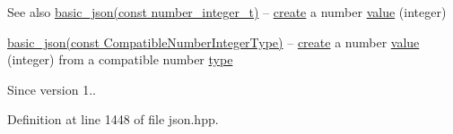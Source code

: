 \begin{DoxySeeAlso}{See also}
\hyperlink{classnlohmann_1_1basic__json_a0d838bc7ffca6017f51167e0a8ffd9b6}{basic\+\_\+json(const number\+\_\+integer\+\_\+t)} -- \hyperlink{classnlohmann_1_1basic__json_a27df4303fbc83071275074486b54a40e}{create} a number \hyperlink{classnlohmann_1_1basic__json_a0a2cbbd95862a623e7dc5c37e67dead0}{value} (integer) 

\hyperlink{classnlohmann_1_1basic__json_ad2eddc2c13ab084f067eaba65d381ad2}{basic\+\_\+json(const Compatible\+Number\+Integer\+Type)} -- \hyperlink{classnlohmann_1_1basic__json_a27df4303fbc83071275074486b54a40e}{create} a number \hyperlink{classnlohmann_1_1basic__json_a0a2cbbd95862a623e7dc5c37e67dead0}{value} (integer) from a compatible number \hyperlink{classnlohmann_1_1basic__json_a848cbae3bd3502ffbf738320bf5eb3aa}{type}
\end{DoxySeeAlso}
\begin{DoxySince}{Since}
version 1.. 
\end{DoxySince}


Definition at line 1448 of file json.\+hpp.

\hypertarget{classnlohmann_1_1basic__json_ad2eddc2c13ab084f067eaba65d381ad2}{}
